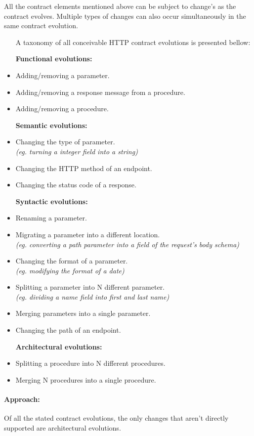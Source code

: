 All the contract elements mentioned above can be subject to change's as the contract evolves.
Multiple types of changes can also occur simultaneously in the same contract evolution.
\begin{itemize}
    \setlength\itemsep{0em}
    \item [A taxonomy of all conceivable HTTP contract evolutions is presented bellow:]
    \item [\textbf{Functional evolutions:}]
    \item Adding/removing a parameter.
    \item Adding/removing a response message from a procedure.
    \item Adding/removing a procedure.
    \item [\textbf{Semantic evolutions:}]
    \item Changing the type of parameter. \\ \textit{(eg. turning a integer field into a string)}
    \item Changing the HTTP method of an endpoint.
    \item Changing the status code of a response.
    \item [\textbf{Syntactic evolutions:}]
    \item Renaming a parameter.
    \item Migrating a parameter into a different location. \\ \textit{(eg. converting a path parameter into a field of the request's body schema)}
    \item Changing the format of a parameter. \\ \textit{(eg. modifying the format of a date)}
    \item Splitting a parameter into N different parameter. \\ \textit{(eg. dividing a name field into first and last name)}
    \item Merging parameters into a single parameter.
    \item Changing the path of an endpoint.
    \item [\textbf{Architectural evolutions:}]
    \item Splitting a procedure into N different procedures.
    \item Merging N procedures into a single procedure.
\end{itemize}

\paragraph{Approach:}
Of all the stated contract evolutions, the only changes that aren't directly supported are architectural evolutions.

